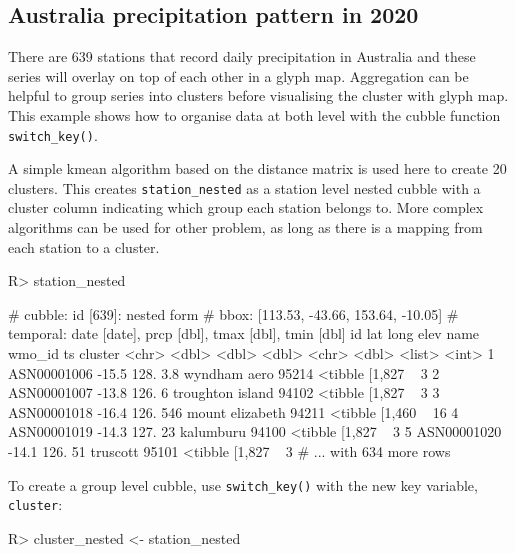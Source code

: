 \documentclass[
]{jss}
\begin{document}
\hypertarget{australia-precipitation-pattern-in-2020}{%
\subsection{Australia precipitation pattern in
2020}\label{australia-precipitation-pattern-in-2020}}

There are 639 stations that record daily precipitation in Australia and
these series will overlay on top of each other in a glyph map.
Aggregation can be helpful to group series into clusters before
visualising the cluster with glyph map. This example shows how to
organise data at both level with the cubble function
\texttt{switch\_key()}.

A simple kmean algorithm based on the distance matrix is used here to
create 20 clusters. This creates \texttt{station\_nested} as a station
level nested cubble with a cluster column indicating which group each
station belongs to. More complex algorithms can be used for other
problem, as long as there is a mapping from each station to a cluster.

\begin{CodeChunk}
\begin{CodeInput}
R> station_nested
\end{CodeInput}
\begin{CodeOutput}
# cubble:   id [639]: nested form
# bbox:     [113.53, -43.66, 153.64, -10.05]
# temporal: date [date], prcp [dbl], tmax [dbl], tmin [dbl]
  id            lat  long  elev name             wmo_id ts               cluster
  <chr>       <dbl> <dbl> <dbl> <chr>             <dbl> <list>             <int>
1 ASN00001006 -15.5  128.   3.8 wyndham aero      95214 <tibble [1,827 ~       3
2 ASN00001007 -13.8  126.   6   troughton island  94102 <tibble [1,827 ~       3
3 ASN00001018 -16.4  126. 546   mount elizabeth   94211 <tibble [1,460 ~      16
4 ASN00001019 -14.3  127.  23   kalumburu         94100 <tibble [1,827 ~       3
5 ASN00001020 -14.1  126.  51   truscott          95101 <tibble [1,827 ~       3
# ... with 634 more rows
\end{CodeOutput}
\end{CodeChunk}

To create a group level cubble, use \texttt{switch\_key()} with the new
key variable, \texttt{cluster}:

\begin{CodeChunk}
\begin{CodeInput}
R> cluster_nested <- station_nested %
\end{CodeInput}
\end{CodeChunk}
\end{document}
